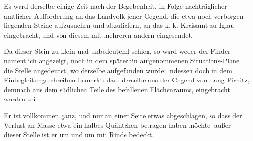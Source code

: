 \documentclass[a4paper, 11pt, oneside, german]{article}
\begin{document}
Es ward derselbe einige Zeit nach der Begebenheit, in Folge nachträglicher amtlicher Aufforderung an das Landvolk jener Gegend, die etwa noch verborgen liegenden Steine aufzusuchen und abzuliefern, an das k. k. Kreisamt zu Iglau eingebracht, und von diesem mit mehreren andern eingesendet.

Da dieser Stein zu klein und unbedeutend schien, so ward weder der Finder namentlich angezeigt, noch in dem späterhin aufgenommenen Situations-Plane die Stelle angedeutet, wo derselbe aufgefunden wurde; indessen doch in dem Einbegleitungsschreiben bemerkt: dass derselbe aus der Gegend von Lang-Pirnitz, demnach aus dem südlichen Teile des befallenen Flächenraums, eingebracht worden sei.

Er ist vollkommen ganz, und nur an einer Seite etwas abgeschlagen, so dass der Verlust an Masse etwa ein halbes Quäntchen betragen haben möchte; außer dieser Stelle ist er um und um mit Rinde bedeckt.
\end{document}
